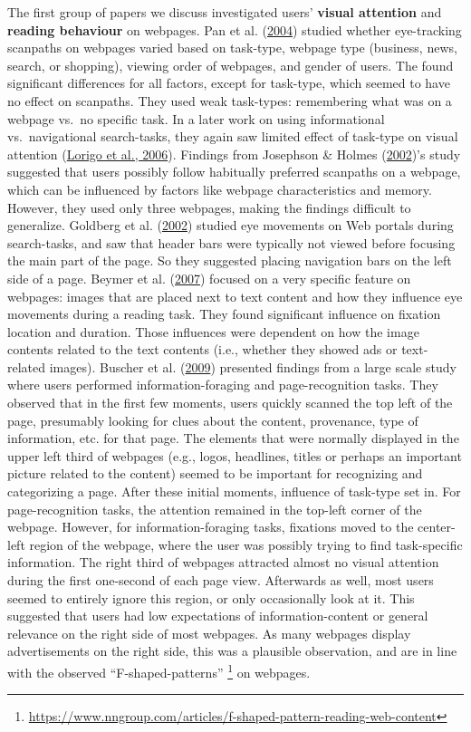 \documentclass[letterpaper, nobind]{templates/ociamthesis}
\begin{document}
The first group of papers we discuss investigated users' \textbf{visual
attention} and \textbf{reading behaviour} on webpages. Pan et al. (\protect\hyperlink{ref-pan2004determinants}{2004})
studied whether eye-tracking scanpaths on webpages varied based on
task-type, webpage type (business, news, search, or shopping), viewing
order of webpages, and gender of users. The found significant
differences for all factors, except for task-type, which seemed to have
no effect on scanpaths. They used weak task-types: remembering what was
on a webpage vs.~no specific task. In a later work on using
informational vs.~navigational search-tasks, they again saw limited
effect of task-type on visual attention (\protect\hyperlink{ref-lorigo2006influence}{Lorigo et al., 2006}). Findings
from Josephson \& Holmes (\protect\hyperlink{ref-josephson2002visual}{2002})'s study suggested that users possibly follow
habitually preferred scanpaths on a webpage, which can be influenced by
factors like webpage characteristics and memory. However, they used only
three webpages, making the findings difficult to generalize.
Goldberg et al. (\protect\hyperlink{ref-goldberg2002eye}{2002}) studied eye movements on Web portals during
search-tasks, and saw that header bars were typically not viewed before
focusing the main part of the page. So they suggested placing navigation
bars on the left side of a page. Beymer et al. (\protect\hyperlink{ref-beymer2007eye}{2007}) focused on a very
specific feature on webpages: images that are placed next to text
content and how they influence eye movements during a reading task. They
found significant influence on fixation location and duration. Those
influences were dependent on how the image contents related to the text
contents (i.e., whether they showed ads or text-related images). Buscher et al. (\protect\hyperlink{ref-110}{2009})
presented findings from a large scale study where users performed
information-foraging and page-recognition tasks. They observed that in
the first few moments, users quickly scanned the top left of the page,
presumably looking for clues about the content, provenance, type of
information, etc. for that page. The elements that were normally
displayed in the upper left third of webpages (e.g., logos, headlines,
titles or perhaps an important picture related to the content) seemed to
be important for recognizing and categorizing a page. After these
initial moments, influence of task-type set in. For page-recognition
tasks, the attention remained in the top-left corner of the webpage.
However, for information-foraging tasks, fixations moved to the
center-left region of the webpage, where the user was possibly trying to
find task-specific information. The right third of webpages attracted
almost no visual attention during the first one-second of each page
view. Afterwards as well, most users seemed to entirely ignore this
region, or only occasionally look at it. This suggested that users had
low expectations of information-content or general relevance on the
right side of most webpages. As many webpages display advertisements on
the right side, this was a plausible observation, and are in line with
the observed ``F-shaped-patterns'' \footnote{
  \url{https://www.nngroup.com/articles/f-shaped-pattern-reading-web-content}} on webpages.
\end{document}
